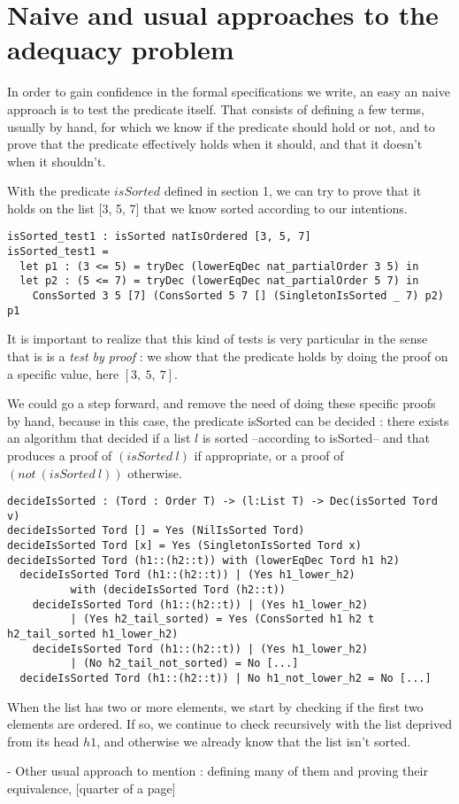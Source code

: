 \section{Naive and usual approaches to the adequacy problem}


In order to gain confidence in the formal specifications we write, an easy an naive approach is to test the predicate itself. That consists of defining a few terms, usually by hand, for which we know if the predicate should hold or not, and to prove that the predicate effectively holds when it should, and that it doesn't when it shouldn't.

With the predicate $isSorted$ defined in section 1, we can try to prove that it holds on the list [3, 5, 7] that we know sorted according to our intentions.

\begin{lstlisting}
isSorted_test1 : isSorted natIsOrdered [3, 5, 7]
isSorted_test1 = 
  let p1 : (3 <= 5) = tryDec (lowerEqDec nat_partialOrder 3 5) in
  let p2 : (5 <= 7) = tryDec (lowerEqDec nat_partialOrder 5 7) in
    ConsSorted 3 5 [7] (ConsSorted 5 7 [] (SingletonIsSorted _ 7) p2) p1
\end{lstlisting}

It is important to realize that this kind of tests is very particular in the sense that is is a \emph{test by proof} : we show that the predicate holds by doing the proof on a specific value, here $[3,\ 5,\ 7]$.

We could go a step forward, and remove the need of doing these specific proofs by hand, because in this case, the predicate isSorted can be decided : there exists an algorithm that decided if a list $l$ is sorted --according to isSorted-- and that produces a proof of $(isSorted\ l)$ if appropriate, or a proof of $(not\ (isSorted\ l))$ otherwise.

\begin{lstlisting}
decideIsSorted : (Tord : Order T) -> (l:List T) -> Dec(isSorted Tord v)
decideIsSorted Tord [] = Yes (NilIsSorted Tord)
decideIsSorted Tord [x] = Yes (SingletonIsSorted Tord x)
decideIsSorted Tord (h1::(h2::t)) with (lowerEqDec Tord h1 h2)
  decideIsSorted Tord (h1::(h2::t)) | (Yes h1_lower_h2) 
          with (decideIsSorted Tord (h2::t))
    decideIsSorted Tord (h1::(h2::t)) | (Yes h1_lower_h2) 
          | (Yes h2_tail_sorted) = Yes (ConsSorted h1 h2 t h2_tail_sorted h1_lower_h2)
    decideIsSorted Tord (h1::(h2::t)) | (Yes h1_lower_h2) 
          | (No h2_tail_not_sorted) = No [...]
  decideIsSorted Tord (h1::(h2::t)) | No h1_not_lower_h2 = No [...]
\end{lstlisting}

When the list has two or more elements, we start by checking if the first two elements are ordered. If so, we continue to check recursively with the list deprived from its head $h1$, and otherwise we already know that the list isn't sorted. 


- Other usual approach to mention : defining many of them and proving their equivalence,
[quarter of a page]



